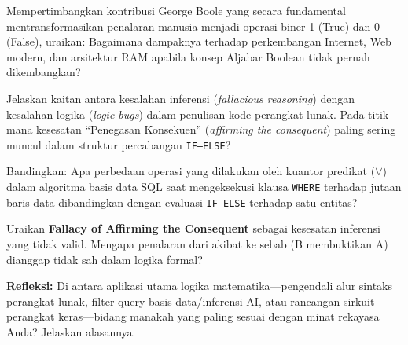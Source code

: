 \documentclass[../main]{subfiles}
\begin{document}
\begin{latihan}
  \item Mempertimbangkan kontribusi George Boole yang secara fundamental mentransformasikan penalaran manusia menjadi operasi biner 1 (True) dan 0 (False), uraikan: Bagaimana dampaknya terhadap perkembangan Internet, Web modern, dan arsitektur RAM apabila konsep Aljabar Boolean tidak pernah dikembangkan?
  \item Jelaskan kaitan antara kesalahan inferensi (\textit{fallacious reasoning}) dengan kesalahan logika (\textit{logic bugs}) dalam penulisan kode perangkat lunak. Pada titik mana kesesatan ``Penegasan Konsekuen'' (\textit{affirming the consequent}) paling sering muncul dalam struktur percabangan \texttt{IF--ELSE}?
  \item Bandingkan: Apa perbedaan operasi yang dilakukan oleh kuantor predikat ($\forall$) dalam algoritma basis data SQL saat mengeksekusi klausa \texttt{WHERE} terhadap jutaan baris data dibandingkan dengan evaluasi \texttt{IF--ELSE} terhadap satu entitas?
  \item Uraikan \textbf{Fallacy of Affirming the Consequent} sebagai kesesatan inferensi yang tidak valid. Mengapa penalaran dari akibat ke sebab (B membuktikan A) dianggap tidak sah dalam logika formal?
  \item \textbf{Refleksi:} Di antara aplikasi utama logika matematika---pengendali alur sintaks perangkat lunak, filter query basis data/inferensi AI, atau rancangan sirkuit perangkat keras---bidang manakah yang paling sesuai dengan minat rekayasa Anda? Jelaskan alasannya.
\end{latihan}

\end{document}
